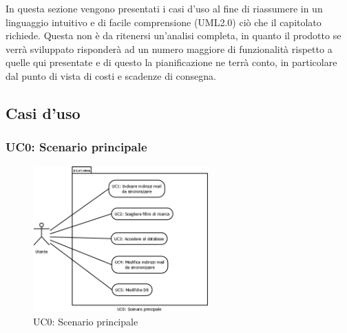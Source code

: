 In questa sezione vengono presentati i casi d\textquoteright{}uso al fine di riassumere in un linguaggio intuitivo e di facile comprensione (UML2.0) ci\`{o} che il capitolato richiede. Questa non \`{e} da ritenersi un\textquoteright{}analisi completa, in quanto il prodotto se verr\`{a} sviluppato risponder\`{a} ad un numero maggiore di funzionalit\`{a} rispetto a quelle qui presentate e di questo la pianificazione ne terr\`{a} conto, in particolare dal punto di vista di costi e scadenze di consegna.

\subsection{Casi d'uso}

\subsubsection[UC0: Scenario principale]{UC0: Scenario principale}
\begin{figure}[H]
  \begin{center}
\includegraphics[width=0.60\textwidth]{img/UC0_ScenarioPrincipale.png}
\caption{UC0: Scenario principale}
\label{fig:UC0}
\end{center}
\end{figure}

